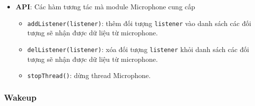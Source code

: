 \begin{itemize}
\item \textbf{API}: Các hàm tương tác mà module Microphone cung cấp
\begin{itemize}
\item \lstinline{addListener(listener)}: thêm đối tượng \lstinline{listener} vào danh sách các đối tượng sẽ nhận được dữ liệu từ microphone.
\item \lstinline{delListener(listener)}: xóa đối tượng \lstinline{listener} khỏi danh sách các đối tượng sẽ nhận được dữ liệu từ microphone.
\item \lstinline{stopThread()}: dừng thread Microphone.
\end{itemize}
\end{itemize}

\subsubsection{Wakeup}
